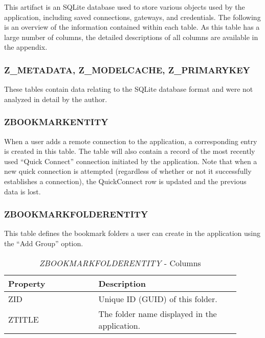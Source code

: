\documentclass[journal]{IEEEtran}
\begin{document}
This artifact is an SQLite \cite{noauthor_sqlite_nodate} database used to store various objects used by the application, including saved connections, gateways, and credentials. The following is an overview of the information contained within each table. As this table has a large number of columns, the detailed descriptions of all columns are available in the appendix.\\

\subsubsection{Z\_METADATA, Z\_MODELCACHE, Z\_PRIMARYKEY}

These tables contain data relating to the SQLite database format and were not analyzed in detail by the author.
\\

\subsubsection{ZBOOKMARKENTITY}

When a user adds a remote connection to the application, a corresponding entry is created in this table. The table will also contain a record of the most recently used “Quick Connect” connection initiated by the application. Note that when a new quick connection is attempted (regardless of whether or not it successfully establishes a connection), the QuickConnect row is updated and the previous data is lost.\\

\subsubsection{ZBOOKMARKFOLDERENTITY}

This table defines the bookmark folders a user can create in the application using the “Add Group” option.

\begin{table}[h!]
\caption{\textit{ZBOOKMARKFOLDERENTITY} - Columns}
\begin{tabular}{p{0.35\linewidth} | p{0.55\linewidth}}
Property              & Description                                                                                           \\ \hline
ZID                   & Unique ID (GUID) of this folder.                                                                      \\
ZTITLE                & The folder name displayed in the application.                                                        
\end{tabular}
\end{table}
\end{document}
